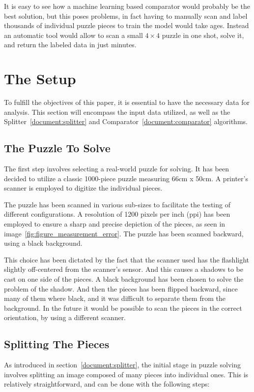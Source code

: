 \documentclass{article}
\begin{document}
It is easy to see how a machine learning based comparator would probably be the best solution, 
but this poses problems, in fact having to manually scan and label thousands of individual puzzle
pieces to train the model would take ages.
Instead an automatic tool would allow to scan a small $4\times4$ puzzle in one shot,
solve it, and return the labeled data in just minutes.


\section{The Setup}

To fulfill the objectives of this paper,
it is essential to have the necessary data for analysis.
This section will encompass the input data utilized,
as well as the Splitter~\ref{document:splitter}
and Comparator~\ref{document:comparator} algorithms.

\subsection{The Puzzle To Solve}

The first step involves selecting a real-world
puzzle for solving. It has been decided to utilize a
classic 1000-piece puzzle measuring 66cm x 50cm.
A printer's scanner is employed to digitize the individual pieces.

The puzzle has been scanned in various sub-sizes to facilitate the testing of different configurations.
A resolution of 1200 pixels per inch (ppi) has been employed to ensure a sharp and precise
depiction of the pieces, as seen in image~\ref{fig:figure_measurement_error}.
The puzzle has been scanned backward, using a black background.

This choice has been dictated by the fact that the scanner used has the flashlight
slightly off-centered from the scanner's sensor.
And this causes a shadows to be cast on one side of the pieces.
A black background has been chosen to solve the problem of the shadow.
And then the pieces has been flipped backward, since many of them where black,
and it was difficult to separate them from the background.
In the future it would be possible to scan the pieces in the correct orientation,
by using a different scanner.


\subsection{Splitting The Pieces}

As introduced in section~\ref{document:splitter},  the initial stage in puzzle solving involves
splitting an image composed of many pieces into individual ones.
This is relatively straightforward, and can be done with the following steps:
\end{document}
